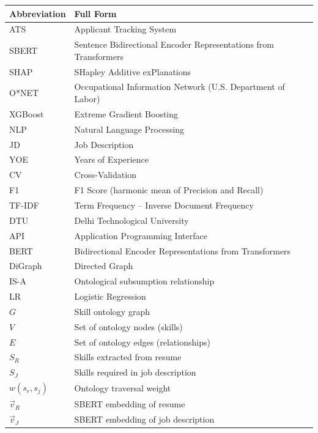 \documentclass[12pt,a4paper]{report}
\begin{document}
\begin{longtable}{p{3cm} p{10cm}}
\toprule
\textbf{Abbreviation} & \textbf{Full Form} \\
\midrule
\endhead
ATS & Applicant Tracking System \\
SBERT & Sentence Bidirectional Encoder Representations from Transformers \\
SHAP & SHapley Additive exPlanations \\
O*NET & Occupational Information Network (U.S. Department of Labor) \\
XGBoost & Extreme Gradient Boosting \\
NLP & Natural Language Processing \\
JD & Job Description \\
YOE & Years of Experience \\
CV & Cross-Validation \\
F1 & F1 Score (harmonic mean of Precision and Recall) \\
TF-IDF & Term Frequency -- Inverse Document Frequency \\
DTU & Delhi Technological University \\
API & Application Programming Interface \\
BERT & Bidirectional Encoder Representations from Transformers \\
DiGraph & Directed Graph \\
IS-A & Ontological subsumption relationship \\
LR & Logistic Regression \\
$G$ & Skill ontology graph \\
$V$ & Set of ontology nodes (skills) \\
$E$ & Set of ontology edges (relationships) \\
$S_R$ & Skills extracted from resume \\
$S_J$ & Skills required in job description \\
$w(s_r, s_j)$ & Ontology traversal weight \\
$\vec{v}_R$ & SBERT embedding of resume \\
$\vec{v}_J$ & SBERT embedding of job description \\
\bottomrule
\end{longtable}

\newpage
{}
\setcounter{page}{1}
\end{document}
